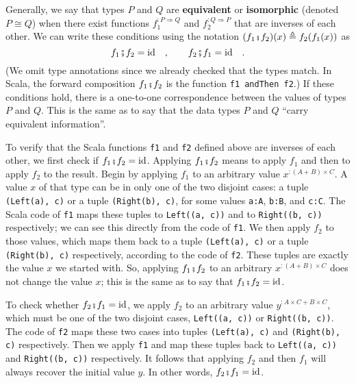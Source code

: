 Generally, we say that types $P$ and $Q$ are \textbf{equivalent}
or \textbf{isomorphic} (denoted $P\cong Q$) when
there exist functions $f_{1}^{:P\Rightarrow Q}$ and $f_{2}^{:Q\Rightarrow P}$
that are inverses of each other. We can write these conditions using
the notation $(f_{1}\bef f_{2})(x)\triangleq f_{2}(f_{1}(x))$ as
\[
f_{1}\bef f_{2}=\text{id}\quad,\quad\quad f_{2}\bef f_{1}=\text{id}\quad.
\]
(We omit type annotations since we already checked that the types
match. In Scala, the forward composition $f_{1}\bef f_{2}$ is the
function \lstinline!f1 andThen f2!.) If these conditions hold, there
is a one-to-one correspondence between the values of types $P$ and
$Q$. This is the same as to say that the data types $P$ and $Q$
``carry equivalent information''.

To verify that the Scala functions \lstinline!f1! and \lstinline!f2!
defined above are inverses of each other, we first check if $f_{1}\bef f_{2}=\text{id}$.
Applying $f_{1}\bef f_{2}$ means to apply $f_{1}$ and then to apply
$f_{2}$ to the result. Begin by applying $f_{1}$ to an arbitrary
value $x^{:(A+B)\times C}$. A value $x$ of that type can be in only
one of the two disjoint cases: a tuple \lstinline!(Left(a), c)! or
a tuple \lstinline!(Right(b), c)!, for some values \lstinline!a:A!,
\lstinline!b:B!, and \lstinline!c:C!. The Scala code of \lstinline!f1!
maps these tuples to \lstinline!Left((a, c))! and to \lstinline!Right((b, c))!
respectively; we can see this directly from the code of \lstinline!f1!.
We then apply $f_{2}$ to those values, which maps them back to a
tuple \lstinline!(Left(a), c)! or a tuple \lstinline!(Right(b), c)!
respectively, according to the code of \lstinline!f2!. These tuples
are exactly the value $x$ we started with. So, applying $f_{1}\bef f_{2}$
to an arbitrary $x^{:(A+B)\times C}$ does not change the value $x$;
this is the same as to say that $f_{1}\bef f_{2}=\text{id}$.

To check whether $f_{2}\bef f_{1}=\text{id}$, we apply $f_{2}$ to
an arbitrary value $y^{:A\times C+B\times C}$, which must be one
of the two disjoint cases, \lstinline!Left((a, c))! or \lstinline!Right((b, c))!.
The code of \lstinline!f2! maps these two cases into tuples \lstinline!(Left(a), c)!
and \lstinline!(Right(b), c)! respectively. Then we apply \lstinline!f1!
and map these tuples back to \lstinline!Left((a, c))! and \lstinline!Right((b, c))!
respectively. It follows that applying $f_{2}$ and then $f_{1}$
will always recover the initial value $y$. In other words, $f_{2}\bef f_{1}=\text{id}$.

